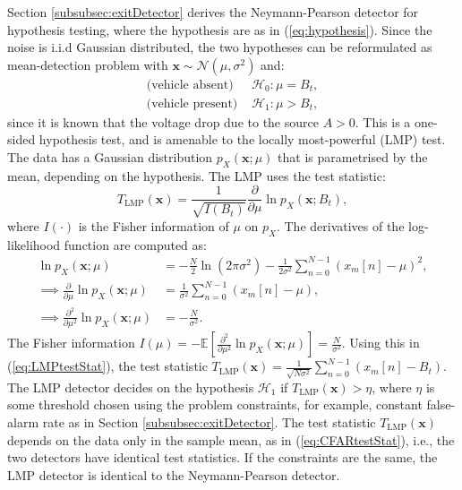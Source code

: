 \documentclass[11pt]{article}
\newcommand{\bx}{\mathbf{x}}
\newcommand{\Ex}{\mathbb{E}}
\newcommand{\cH}{\mathcal{H}}
\newcommand{\cN}{\mathcal{N}}
\begin{document}
Section \ref{subsubsec:exitDetector} derives the Neymann-Pearson detector for hypothesis testing, where the hypothesis are as in (\ref{eq:hypothesis}). Since the noise is i.i.d Gaussian distributed, the two hypotheses can be reformulated as mean-detection problem with $\bx \sim \cN(\mu, \sigma^{2})$ and:
\begin{equation}
\begin{split}
	\text{(vehicle absent) } &\cH_{0}: \mu = B_{t}, \\
	\text{(vehicle present) } &\cH_{1}: \mu > B_{t},
\end{split}
\label{eq:LMPhypothesis}
\end{equation}
since it is known that the voltage drop due to the source $A>0$. This is a one-sided hypothesis test, and is amenable to the locally most-powerful (LMP) test. The data has a Gaussian distribution $p_{X}(\bx;\mu)$ that is parametrised by the mean, depending on the hypothesis. The LMP uses the test statistic:
\begin{equation}
	T_{\text{LMP}}(\bx) = \frac{1}{\sqrt{I(B_{t})}} \frac{\partial}{\partial \mu} \ln p_{X}(\bx;B_{t}),
\label{eq:LMPtestStat}
\end{equation}
where $I(\cdot)$ is the Fisher information of $\mu$ on $p_{X}$. The derivatives of the log-likelihood function are computed as:
\begin{equation}
\begin{split}
	\ln p_{X}(\bx;\mu) &= -\frac{N}{2}\ln(2\pi\sigma^{2}) - \frac{1}{2\sigma^{2}} \sum_{n=0}^{N-1} \left( x_{m}[n] - \mu \right)^{2}, \\
	\implies \frac{\partial}{\partial \mu} \ln p_{X}(\bx;\mu) &= \frac{1}{\sigma^{2}} \sum_{n=0}^{N-1} \left( x_{m}[n] - \mu \right), \\
	\implies \frac{\partial^{2}}{\partial \mu^{2}} \ln p_{X}(\bx;\mu) &= -\frac{N}{\sigma^{2}}.
\end{split}
\label{eq:LMPderivative}
\end{equation}
The Fisher information $I(\mu) = -\Ex[\frac{\partial^{2}}{\partial \mu^{2}} \ln p_{X}(\bx;\mu)] = \frac{N}{\sigma^{2}}$. Using this in (\ref{eq:LMPtestStat}), the test statistic $T_{\text{LMP}}(\bx) = \frac{1}{\sqrt{N\sigma^{2}}} \sum_{n=0}^{N-1}\left( x_{m}[n] - B_{t} \right)$. The LMP detector decides on the hypothesis $\cH_{1}$ if $T_{\text{LMP}}(\bx) > \eta$, where $\eta$ is some threshold chosen using the problem constraints, for example, constant false-alarm rate as in Section \ref{subsubsec:exitDetector}. The test statistic $T_{\text{LMP}}(\bx)$ depends on the data only in the sample mean, as in (\ref{eq:CFARtestStat}), i.e., the two detectors have identical test statistics. If the constraints are the same, the LMP detector is identical to the Neymann-Pearson detector.
\end{document}
